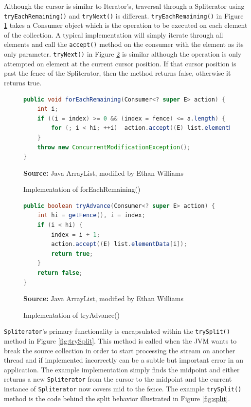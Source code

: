 \documentclass[oneside, 12pt]{article}
\newcommand{\source}[1]{\textbf{Source:} {#1} }
\begin{document}
Although the cursor is similar to Iterator's, traversal through a Spliterator using \verb|tryEachRemaining()| and \verb|tryNext()| is different. \verb|tryEachRemaining()| in Figure \ref{fig:forEachRemaining} takes a Consumer object which is the operation to be executed on each element of the collection. A typical implementation will simply iterate through all elements and call the \verb|accept()| method on the consumer with the element as its only parameter. \verb|tryNext()| in Figure \ref{fig:tryAdvance} is similar although the operation is only attempted on element at the current cursor position. If that cursor position is past the fence of the Spliterator, then the method returns false, otherwise it returns true.

\begin{figure}[H]
\centering
\begin{lstlisting}[language=Java]
public void forEachRemaining(Consumer<? super E> action) {
    int i;
    if ((i = index) >= 0 && (index = fence) <= a.length) {
        for (; i < hi; ++i)  action.accept((E) list.elementData[i]);
    }
    throw new ConcurrentModificationException();
}
\end{lstlisting}
\caption{Implementation of forEachRemaining()}
\source{Java ArrayList, modified by Ethan Williams}
\label{fig:forEachRemaining}
\end{figure}

\begin{figure}[H]
\centering
\begin{lstlisting}[language=Java]
public boolean tryAdvance(Consumer<? super E> action) {
    int hi = getFence(), i = index;
    if (i < hi) {
        index = i + 1;
        action.accept((E) list.elementData[i]);
        return true;
    }
    return false;
}
\end{lstlisting}
\caption{Implementation of tryAdvance()}
\source{Java ArrayList, modified by Ethan Williams}
\label{fig:tryAdvance}
\end{figure}

\verb|Spliterator|'s primary functionality is encapsulated within the \verb|trySplit()| method in Figure \ref{fig:trySplit}. This method is called when the JVM wants to break the source collection in order to start processing the stream on another thread and if implemented incorrectly can be a subtle but important error in an application. The example implementation simply finds the midpoint and either returns a new \verb|Spliterator| from the cursor to the midpoint and the current instance of \verb|Spliterator| now covers mid to the fence. The example \verb|trySplit()| method is the code behind the split behavior illustrated in Figure \ref{fig:split}.
\end{document}
